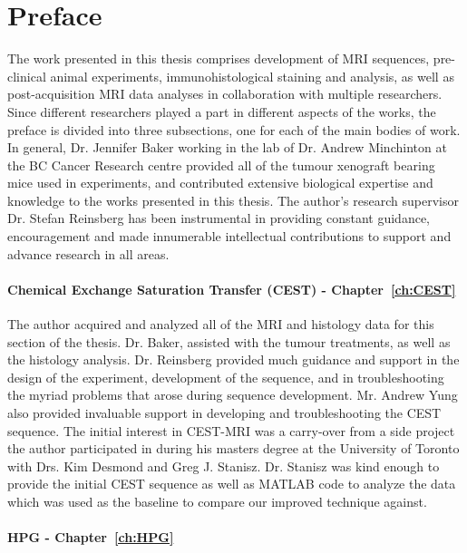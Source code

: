 
\chapter{Preface}

The work presented in this thesis comprises development of MRI sequences, pre-clinical animal experiments, immunohistological staining and analysis, as well as post-acquisition MRI data analyses in collaboration with multiple researchers.
Since different researchers played a part in different aspects of the works, the preface is divided into three subsections, one for each of the main bodies of work.
In general, Dr. Jennifer Baker working in the lab of Dr. Andrew Minchinton at the BC Cancer Research centre provided all of the tumour xenograft bearing mice used in experiments, and contributed extensive biological expertise and knowledge to the works presented in this thesis.
The author's research supervisor Dr. Stefan Reinsberg has been instrumental in providing constant guidance, encouragement and made innumerable intellectual contributions to support and advance research in all areas.

\subsubsection{Chemical Exchange Saturation Transfer (CEST) - Chapter~\ref{ch:CEST}}

The author acquired and analyzed all of the MRI and histology data for this section of the thesis.
Dr. Baker, assisted with the tumour treatments, as well as the histology analysis.
Dr. Reinsberg provided much guidance and support in the design of the experiment, development of the sequence, and in troubleshooting the myriad problems that arose during sequence development. 
Mr. Andrew Yung also provided invaluable support in developing and troubleshooting the CEST sequence.
The initial interest in CEST-MRI was a carry-over from a side project the author participated in during his masters degree at the University of Toronto with Drs. Kim Desmond and Greg J. Stanisz. 
Dr. Stanisz was kind enough to provide the initial CEST sequence as well as MATLAB code to analyze the data which was used as the baseline to compare our improved technique against.

\subsubsection{HPG - Chapter~\ref{ch:HPG}}

